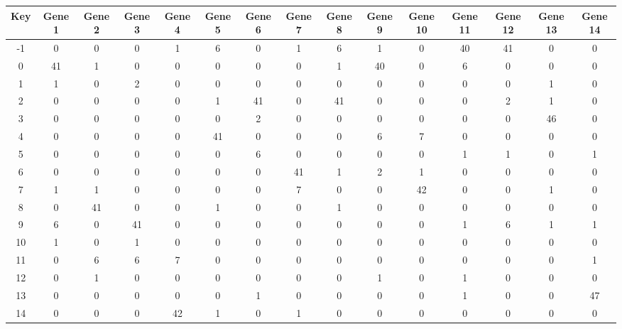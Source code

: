 \begin{tabular}{|c|c|c|c|c|c|c|c|c|c|c|c|c|c|c|}
\hline
Key & Gene 1 & Gene 2 & Gene 3 & Gene 4 & Gene 5 & Gene 6 & Gene 7 & Gene 8 & Gene 9 & Gene 10 & Gene 11 & Gene 12 & Gene 13 & Gene 14 \\
\hline
-1 & 0 & 0 & 0 & 1 & 6 & 0 & 1 & 6 & 1 & 0 & 40 & 41 & 0 & 0 \\
0 & 41 & 1 & 0 & 0 & 0 & 0 & 0 & 1 & 40 & 0 & 6 & 0 & 0 & 0 \\
1 & 1 & 0 & 2 & 0 & 0 & 0 & 0 & 0 & 0 & 0 & 0 & 0 & 1 & 0 \\
2 & 0 & 0 & 0 & 0 & 1 & 41 & 0 & 41 & 0 & 0 & 0 & 2 & 1 & 0 \\
3 & 0 & 0 & 0 & 0 & 0 & 2 & 0 & 0 & 0 & 0 & 0 & 0 & 46 & 0 \\
4 & 0 & 0 & 0 & 0 & 41 & 0 & 0 & 0 & 6 & 7 & 0 & 0 & 0 & 0 \\
5 & 0 & 0 & 0 & 0 & 0 & 6 & 0 & 0 & 0 & 0 & 1 & 1 & 0 & 1 \\
6 & 0 & 0 & 0 & 0 & 0 & 0 & 41 & 1 & 2 & 1 & 0 & 0 & 0 & 0 \\
7 & 1 & 1 & 0 & 0 & 0 & 0 & 7 & 0 & 0 & 42 & 0 & 0 & 1 & 0 \\
8 & 0 & 41 & 0 & 0 & 1 & 0 & 0 & 1 & 0 & 0 & 0 & 0 & 0 & 0 \\
9 & 6 & 0 & 41 & 0 & 0 & 0 & 0 & 0 & 0 & 0 & 1 & 6 & 1 & 1 \\
10 & 1 & 0 & 1 & 0 & 0 & 0 & 0 & 0 & 0 & 0 & 0 & 0 & 0 & 0 \\
11 & 0 & 6 & 6 & 7 & 0 & 0 & 0 & 0 & 0 & 0 & 0 & 0 & 0 & 1 \\
12 & 0 & 1 & 0 & 0 & 0 & 0 & 0 & 0 & 1 & 0 & 1 & 0 & 0 & 0 \\
13 & 0 & 0 & 0 & 0 & 0 & 1 & 0 & 0 & 0 & 0 & 1 & 0 & 0 & 47 \\
14 & 0 & 0 & 0 & 42 & 1 & 0 & 1 & 0 & 0 & 0 & 0 & 0 & 0 & 0 \\
\hline
\end{tabular}